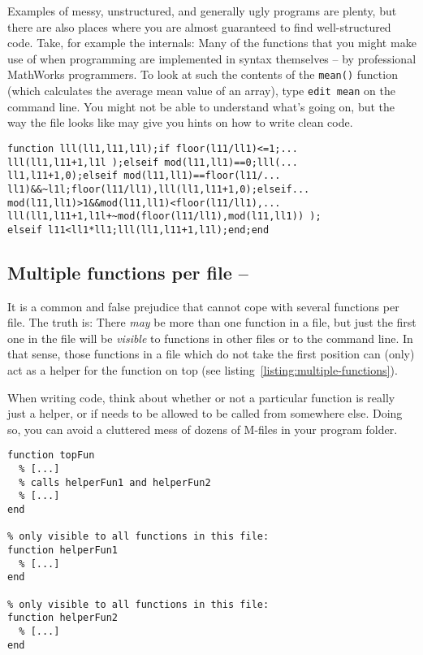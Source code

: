 Examples of messy, unstructured, and generally ugly programs are plenty, but
there are also places where you are almost guaranteed to find well-structured
code. Take, for example the \matlab{} internals: Many of the functions that
you might make use of when programming \matlab{} are implemented in \matlab{}
syntax themselves -- by professional MathWorks programmers. To look at such
the contents of the \lstinline!mean()! function (which calculates the average
mean value of an array), type \lstinline!edit mean! on the \matlab{} command
line. You might not be able to understand what's going on, but the way the
file looks like may give you hints on how to write clean code.


\begin{lstlisting}[framerule=2pt,rulecolor=\color{badred},float=b,label={listing:prime1},caption={Perfectly legal \matlab{} code, with all rules of style ignored. Can you guess what this function does?}]
function lll(ll1,l11,l1l);if floor(l11/ll1)<=1;...
lll(ll1,l11+1,l1l );elseif mod(l11,ll1)==0;lll(...
ll1,l11+1,0);elseif mod(l11,ll1)==floor(l11/...
ll1)&&~l1l;floor(l11/ll1),lll(ll1,l11+1,0);elseif...
mod(l11,ll1)>1&&mod(l11,ll1)<floor(l11/ll1),...
lll(ll1,l11+1,l1l+~mod(floor(l11/ll1),mod(l11,ll1)) );
elseif l11<ll1*ll1;lll(ll1,l11+1,l1l);end;end
\end{lstlisting}

\subsection{Multiple functions per file  -- \cleansymbol\cleansymbol\cleansymbol}
It is a common and false prejudice that \matlab{} cannot cope with several
functions per file. The truth is: There \emph{may} be more than one function
in a file, but just the first one in the file will be \emph{visible} to
functions in other files or to the command line. In that sense, those
functions in a file which do not take the first position can (only) act as a
helper for the function on top (see listing~\ref{listing:multiple-functions}).

When writing code, think about whether or not a particular function is really
just a helper, or if needs to be allowed to be called from somewhere else.
Doing so, you can avoid a cluttered mess of dozens of M-files in your program
folder.

\begin{lstlisting}[framerule=2pt,rulecolor=\color{goodgreen},float,label={listing:multiple-functions},caption={One source containing three functions: Useful when \lstinline!helperFun1! and \lstinline!helperFun2! are only needed by \lstinline!topFun!.}]
% callable from outside:
function topFun
  % [...]
  % calls helperFun1 and helperFun2
  % [...]
end

% only visible to all functions in this file:
function helperFun1
  % [...]
end

% only visible to all functions in this file:
function helperFun2
  % [...]
end
\end{lstlisting}


